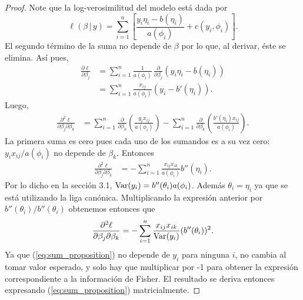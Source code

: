 \begin{proof}
	Note que la log-verosimilitud del modelo está dada por
    \begin{equation*}
    	\ell(\beta \, | \, y) = \sum_{i=1}^{n} \left[ \frac{y_i\eta_i - b(\eta_i)}{a(\phi_i)} + c(y_i, \phi_i) \right].
    \end{equation*}
    El segundo término de la suma no depende de $\beta$ por lo que, al derivar, éste se elimina. Así pues,
    \begin{align*}
    	\frac{\partial \ell}{\partial \beta_j} &= \sum_{i=1}^{n} \frac{1}{a(\phi_i)} \, \frac{\partial}{\partial \beta_j} (y_i \eta_i - b(\eta_i)) \\
        &= \sum_{i=1}^{n} \frac{x_{ij}}{a(\phi_i)} (y_i - b'(\eta_i) ).
    \end{align*}
    Luego,
    \begin{align*}
    	\frac{\partial^2 \ell}{\partial \beta_j \partial \beta_k} &= \sum_{i=1}^{n} \frac{\partial}{\partial \beta_k} \left( \frac{y_i x_{ij}}{a(\phi_i)} \right) - \sum_{i=1}^{n} \frac{\partial}{\partial \beta_k} \left( \frac{b'(\eta_i) x_{ij}}{a(\phi_i)} \right).
    \end{align*}
    La primera suma es cero pues cada uno de los sumandos es a su vez cero: $y_i x_{ij} / a(\phi_i)$ no depende de $\beta_k$. Entonces
    \begin{align*}
    	\frac{\partial^2 \ell}{\partial \beta_j \partial \beta_k} &= -\sum_{i=1}^{n} \frac{x_{ij} x_{ik}}{a(\phi_i)} b''(\eta_i).
    \end{align*}
    Por lo dicho en la sección 3.1, $\mathrm{Var} (y_i) = b''(\theta_i) a(\phi_i)$. Además $\theta_i = \eta_i$ ya que se está utilizando la liga canónica. Multiplicando la expresión anterior por $b''(\theta_i) / b''(\theta_i)$ obtenemos entonces que
    \begin{equation} \label{eq:sum_proposition}
    	\frac{\partial^2 \ell}{\partial \beta_j \partial \beta_k} = -\sum_{i=1}^{n} \frac{x_{ij} x_{ik}}{\mathrm{Var} (y_i)} (b''(\theta_i))^2.
    \end{equation}
    Ya que (\ref{eq:sum_proposition}) no depende de $y_i$ para ninguna $i$, no cambia al tomar valor esperado, y solo hay que multiplicar por -1 para obtener la expresión correspondiente a la información de Fisher. El resultado se deriva entonces expresando (\ref{eq:sum_proposition}) matricialmente.
\end{proof}


